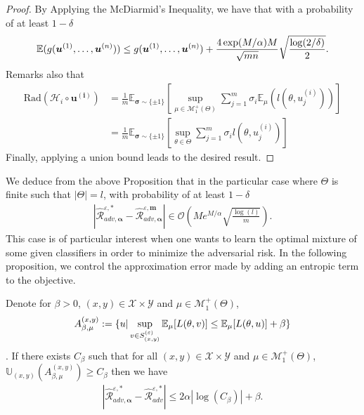 \begin{proof}
By Applying the McDiarmid’s Inequality, we have that with a probability of at least $1-\delta$
\begin{align*}
\mathbb{E}(g(\bm{u}^{(1)},\dots,\bm{u}^{(n)}))\leq g(\bm{u}^{(1)},\dots,\bm{u}^{(n)}) +\frac{4\exp(M/\alpha)M}{\sqrt{mn}}\sqrt{\frac{\log(2/\delta)}{2}}.
\end{align*}
Remarks also that 
\begin{align*}
    \text{Rad}(\mathcal{H}_i\circ \mathbf{u^{(i)}})&=\frac{1}{m}\mathbb{E}_{\bm{\sigma}\sim\{\pm 1\}}\left[\sup_{\mu\in\mathcal{M}_1^{+}(\Theta)}\sum_{j=1}^m\sigma_i\mathbb{E}_{\mu}(l(\theta,u^{(i)}_j))\right]\\
    &=\frac{1}{m}\mathbb{E}_{\bm{\sigma}\sim\{\pm 1\}}\left[\sup_{\theta\in\Theta}\sum_{j=1}^m\sigma_i l(\theta,u^{(i)}_j)\right]
\end{align*}
Finally, applying a union bound leads to the desired result.

\end{proof}




We deduce from the above Proposition that in the particular case where $\Theta$ is finite such that $|\Theta|= l$, with probability of at least $1-\delta$
\begin{align*}
   |\widehat{\mathcal{R}}_{adv,\bm{\alpha}}^{\varepsilon,*} - \widehat{\mathcal{R}}_{adv,\bm{\alpha}}^{\varepsilon,\bm{m}}| \in \mathcal{O}\left(Me^{M/\alpha}\sqrt{\frac{\log(l)}{m}} \right).
\end{align*}
This case is of particular interest when one wants to learn the optimal mixture of some given classifiers in order to minimize the adversarial risk. In the following proposition, we control the approximation error made by adding an entropic term to the objective. %
\begin{prop}
\label{prop:control-error-approx}
Denote for $\beta>0$, $(x,y)\in\mathcal{X}\times\mathcal{Y}$ and $\mu\in\mathcal{M}_{1}^{+}(\Theta)$,
    $$A_{\beta,\mu}^{\left(  x,y\right)}:=\{u|\sup_{v\in  S_{(x,y)}^{(\varepsilon)}}\mathbb{E}_{\mu}[\loss(\theta,v)]\leq \mathbb{E}_{\mu}[\loss(\theta,u)]+\beta\}$$. 
    If there exists $C_{\beta}$ such that for all $(x,y)\in\mathcal{X}\times\mathcal{Y}$ and $\mu\in\mathcal{M}_{1}^{+}(\Theta)$, $\mathbb{U}_{(x,y)}\left(A_{\beta,\mu}^{\left(  x,y\right)}\right)\geq C_\beta$ then we have
\begin{align*}
   |\widehat{\mathcal{R}}_{adv,\bm{\alpha}}^{\varepsilon,*} - \widehat{\mathcal{R}}_{adv}^{\varepsilon,*}|\leq 2\alpha |\log(C_\beta)| + \beta.
\end{align*}
\end{prop}




